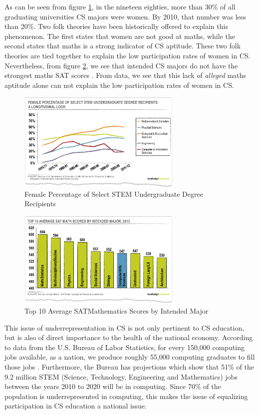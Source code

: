 \documentclass[oneside,titlepage,numbers=noenddot,headinclude,%
               footinclude=true,cleardoublepage=empty,abstractoff,BCOR=2mm,%
               paper=a4,fontsize=11pt,ngerman,american]{scrreprt}
\numberwithin{theorem}{chapter}
\numberwithin{definition}{chapter}
\numberwithin{algorithm}{chapter}
\numberwithin{figure}{chapter}
\numberwithin{table}{chapter}
\numberwithin{equation}{chapter}
\begin{document}
As can be seen from figure \ref{femSTEMgrad}, in the nineteen eighties, more than 30\% of all graduating universities CS majors were women. By 2010, that number was less than 20\%. Two folk theories have been historically offered to explain this phenomenon. The first states that women are not good at maths, while the second states that maths is a strong indicator of CS aptitude. These two folk theories are tied together to explain the low participation rates of women in CS. Nevertheless, from figure \ref{satMathMajor}, we see that intended CS majors do not have the strongest maths SAT scores \cite{Kinnunen:2006:WSD:1151588.1151604}. From data, we see that this lack of \textit{alleged} maths aptitude alone can not explain the low participation rates of women in CS.
\begin{figure}[hbtp]
  \centering
  \includegraphics[width=0.7\textwidth]{percentwomencs}
   \caption{Female Percentage of Select STEM Undergraduate Degree Recipients}
   \label{femSTEMgrad}
\end{figure}

\begin{figure}[hbtp]
  \centering
  \includegraphics[width=0.7\textwidth]{TopSATMathIntendedMajor2013_NCWIT_SecondaryEd}
   \caption{Top 10 Average SATMathematics Scores by Intended Major}
   \label{satMathMajor}
\end{figure}

This issue of underrepresentation in CS is not only pertinent to CS education, but is also of direct importance to the health of the national economy. According to data from the U.S. Bureau of Labor Statistics, for every 150,000 computing jobs available, as a nation, we produce roughly 55,000 computing graduates to fill those jobs \cite{Labor-Statistics-BLS:aa}. Furthermore, the Bureau has projections which show that 51\% of the 9.2 million STEM (Science, Technology, Engineering and Mathematics) jobs between the years 2010 to 2020 will be in computing. Since 70\% of the population is underrepresented in computing, this makes the issue of equalizing participation in CS education a national issue. 
\end{document}
